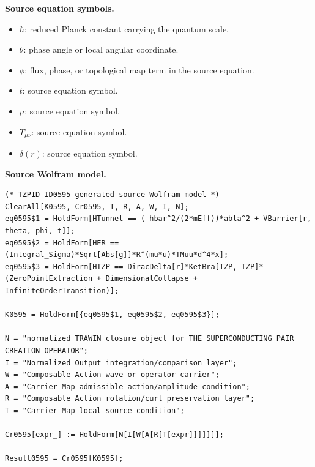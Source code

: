\begin{minipage}[t]{0.49\linewidth}
\begingroup
\small
\raggedright
\textbf{Source equation symbols.}\par
\begin{itemize}[leftmargin=1.35em,itemsep=1pt,topsep=1pt,parsep=0pt]
    \item $\hbar$: reduced Planck constant carrying the quantum scale.
    \item $\theta$: phase angle or local angular coordinate.
    \item $\phi$: flux, phase, or topological map term in the source equation.
    \item $t$: source equation symbol.
    \item $\mu$: source equation symbol.
    \item $T_{\mu\nu}$: source equation symbol.
    \item $\delta(r)$: source equation symbol.
\end{itemize}
\endgroup
\end{minipage}\hfill
\begin{minipage}[t]{0.47\linewidth}
\begingroup
\scriptsize
\raggedright
\textbf{Source Wolfram model.}\par
\begin{Verbatim}[fontsize=\tiny,breaklines=true,breakanywhere=true]
(* TZPID ID0595 generated source Wolfram model *)
ClearAll[K0595, Cr0595, T, R, A, W, I, N];
eq0595$1 = HoldForm[HTunnel == (-hbar^2/(2*mEff))*abla^2 + VBarrier[r, theta, phi, t]];
eq0595$2 = HoldForm[HER == (Integral_Sigma)*Sqrt[Abs[g]]*R^(mu*u)*TMuu*d^4*x];
eq0595$3 = HoldForm[HTZP == DiracDelta[r]*KetBra[TZP, TZP]*(ZeroPointExtraction + DimensionalCollapse + InfiniteOrderTransition)];

K0595 = HoldForm[{eq0595$1, eq0595$2, eq0595$3}];

N = "normalized TRAWIN closure object for THE SUPERCONDUCTING PAIR CREATION OPERATOR";
I = "Normalized Output integration/comparison layer";
W = "Composable Action wave or operator carrier";
A = "Carrier Map admissible action/amplitude condition";
R = "Composable Action rotation/curl preservation layer";
T = "Carrier Map local source condition";

Cr0595[expr_] := HoldForm[N[I[W[A[R[T[expr]]]]]]];

Result0595 = Cr0595[K0595];
\end{Verbatim}
\endgroup
\end{minipage}

